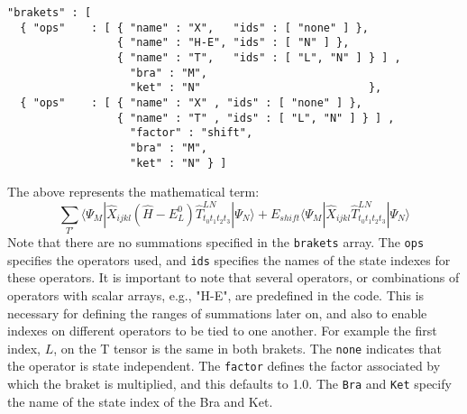\begin{lstlisting}[label={lst:brakets}]
"brakets" : [
  { "ops"    : [ { "name" : "X",   "ids" : [ "none" ] },
                 { "name" : "H-E", "ids" : [ "N" ] },
                 { "name" : "T",   "ids" : [ "L", "N" ] } ] ,
                   "bra" : "M",
                   "ket" : "N"                          }, 
  { "ops"    : [ { "name" : "X" , "ids" : [ "none" ] },
                 { "name" : "T" , "ids" : [ "L", "N" ] } ] ,
                   "factor" : "shift",
                   "bra" : "M",
                   "ket" : "N" } ] 
\end{lstlisting}         
The above represents the mathematical term:
\begin{equation}
\sum_{T'}
\langle \Psi_{M} |  \hat{X}_{ijkl} ( \hat{H}-E^{0}_{L} ) \hat{T}^{LN}_{ t_{0}t_{1}t_{2}t_{3} } | \Psi_{N} \rangle + 
E_{shift}\langle \Psi_{M} |  \hat{X}_{ijkl}  \hat{T}^{LN}_{ t_{0}t_{1}t_{2}t_{3} }| \Psi_{N} \rangle 
\end{equation}
\noindent Note that there are no summations specified in the \texttt{brakets} array. 
The \texttt{ops} specifies the operators used, and \texttt{ids} specifies the names of the state indexes
for these operators. It is important to note that several operators, or combinations of
operators with scalar arrays, e.g., "H-E", are predefined in the code. 
This is necessary for defining the ranges of summations later on, and also to enable indexes on 
different operators to be tied to one another. For example the first index, $L$, on the T tensor is the same in 
both brakets. The \texttt{none} indicates that the operator is state independent.
The \texttt{factor} defines the factor associated by which the braket is multiplied, and this
defaults to 1.0. The \texttt{Bra} and \texttt{Ket} specify the name of the state index of the Bra and Ket. \\

